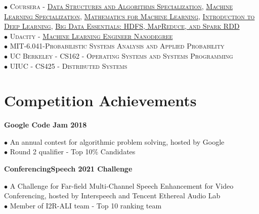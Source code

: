 \documentclass[10pt]{article}
\begin{document}
        $\bullet$ \textsc{Coursera - \href{https://www.coursera.org/account/accomplishments/specialization/certificate/AKFYZQ9QD8XH}{Data Structures and Algorithms Specialization}}, \textsc{\href{https://www.coursera.org/account/accomplishments/specialization/certificate/ZUGAFYKCMQ79}{Machine Learning Specialization}}, \textsc{\href{https://www.coursera.org/account/accomplishments/specialization/certificate/N3D6C3DT8QAY?utm_medium=certificate&utm_source=link&utm_campaign=copybutton_certificate}{Mathematics for Machine Learning}}, \textsc{\href{https://www.coursera.org/account/accomplishments/certificate/XN2B7T4AJX8C}{Introduction to Deep Learning}}, \textsc{\href{https://www.coursera.org/account/accomplishments/certificate/G25TQPPNXGW5}{Big Data Essentials: HDFS, MapReduce, and Spark RDD}} \\
        $\bullet$ \textsc{Udacity - \href{https://graduation.udacity.com/confirm/HK9JLR3N}{Machine Learning Engineer Nanodegree}} \\
        $\bullet$ \textsc{MIT-6.041-Probabilistic Systems Analysis and Applied Probability} \\
        $\bullet$ \textsc{UC Berkeley - CS162 - Operating Systems and Systems Programming} \\
        $\bullet$ \textsc{UIUC - CS425 - Distributed Systems}

    \vspace{2mm}
    \section{Competition Achievements}
        \begin{flushleft}
            \textbf{Google Code Jam 2018}
        \end{flushleft}
        \vspace{-1.5mm}
        $\bullet$ An annual contest for algorithmic problem solving, hosted by Google \\
        $\bullet$ Round 2 qualifier - Top 10\% Candidates \\

        \begin{flushleft}
            \textbf{ConferencingSpeech 2021 Challenge}
        \end{flushleft}
        \vspace{-1.5mm}
        $\bullet$ A Challenge for Far-field Multi-Channel Speech Enhancement for Video Conferencing, hosted by Interspeech and Tencent Ethereal Audio Lab \\
        $\bullet$ Member of I2R-ALI team - Top 10 ranking team
\end{document}
